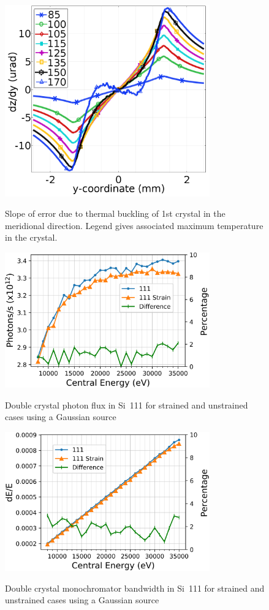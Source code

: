 \documentclass{iucr}
\begin{document}
\begin{figure}
\caption{Slope of error due to thermal buckling of 1st crystal in the meridional direction. Legend gives associated maximum temperature in the crystal.}
\includegraphics[width = 8.85cm]{images/slope.png}
\label{fig:yslope}
\end{figure}

\begin{figure}
\caption{Double crystal photon flux in Si~111 for strained and unstrained cases using a Gaussian source}
\includegraphics[width = 8.85cm]{images/111flux.png}
\label{fig:111flux}
\end{figure}

\begin{figure}
\caption{Double crystal monochromator bandwidth in Si~111 for strained and unstrained cases using a Gaussian source}
\includegraphics[width = 8.85cm]{images/111monobw.png}
\label{fig:111monobw}
\end{figure}
\end{document}
